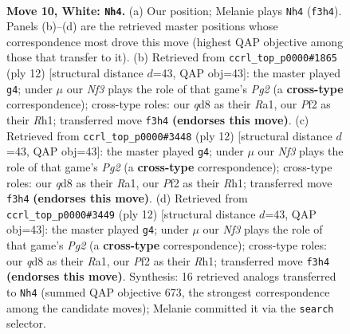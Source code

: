 \documentclass[11pt]{article}
\begin{document}
\clearpage

\begin{figure}[p]\centering
\begin{subfigure}{0.46\textwidth}\centering
\resizebox{\linewidth}{!}{%
\newchessgame
\chessboard[
  setfen={rnbqk2r/1p2bp2/4pnp1/p1Pp3p/3P4/2N2N1P/PP3PP1/R1BQKBR1 w Qkq - 0 10},
  showmover=false,
  pgfstyle=straightmove, color=movearrow, markmove={f3-h4}
]}
\caption{}
\end{subfigure}\hfill
\begin{subfigure}{0.46\textwidth}\centering
\resizebox{\linewidth}{!}{%
\newchessgame
\chessboard[
  setfen={rnbqkb1r/1p3ppp/p2ppn2/8/3NP3/2N4P/PPP2PP1/R1BQKB1R w KQkq - 0 7},
  showmover=false,
  pgfstyle=straightmove, color=movearrow, markmove={g2-g4}
]}
\caption{}
\end{subfigure}
\\[4pt]
\begin{subfigure}{0.46\textwidth}\centering
\resizebox{\linewidth}{!}{%
\newchessgame
\chessboard[
  setfen={rnbqkb1r/1p3ppp/p2ppn2/8/3NP3/2N4P/PPP2PP1/R1BQKB1R w KQkq - 0 7},
  showmover=false,
  pgfstyle=straightmove, color=movearrow, markmove={g2-g4}
]}
\caption{}
\end{subfigure}\hfill
\begin{subfigure}{0.46\textwidth}\centering
\resizebox{\linewidth}{!}{%
\newchessgame
\chessboard[
  setfen={rnbqkb1r/1p3ppp/p2ppn2/8/3NP3/2N4P/PPP2PP1/R1BQKB1R w KQkq - 0 7},
  showmover=false,
  pgfstyle=straightmove, color=movearrow, markmove={g2-g4}
]}
\caption{}
\end{subfigure}
\caption{\textbf{Move 10, White: \texttt{Nh4}.} (a) Our position; Melanie plays \texttt{Nh4} (\texttt{f3h4}). Panels (b)--(d) are the retrieved master positions whose correspondence most drove this move (highest QAP objective among those that transfer to it). (b) Retrieved from \texttt{ccrl\_top\_p0000\#1865} (ply 12) [structural distance $d$=43, QAP obj=43]: the master played \texttt{g4}; under $\mu$ our \emph{Nf3} plays the role of that game's \emph{Pg2} (a \textbf{cross-type} correspondence); cross-type roles: our \emph{q}d8 as their \emph{R}a1, our \emph{P}f2 as their \emph{R}h1; transferred move \texttt{f3h4} \textbf{(endorses this move)}. (c) Retrieved from \texttt{ccrl\_top\_p0000\#3448} (ply 12) [structural distance $d$=43, QAP obj=43]: the master played \texttt{g4}; under $\mu$ our \emph{Nf3} plays the role of that game's \emph{Pg2} (a \textbf{cross-type} correspondence); cross-type roles: our \emph{q}d8 as their \emph{R}a1, our \emph{P}f2 as their \emph{R}h1; transferred move \texttt{f3h4} \textbf{(endorses this move)}. (d) Retrieved from \texttt{ccrl\_top\_p0000\#3449} (ply 12) [structural distance $d$=43, QAP obj=43]: the master played \texttt{g4}; under $\mu$ our \emph{Nf3} plays the role of that game's \emph{Pg2} (a \textbf{cross-type} correspondence); cross-type roles: our \emph{q}d8 as their \emph{R}a1, our \emph{P}f2 as their \emph{R}h1; transferred move \texttt{f3h4} \textbf{(endorses this move)}. Synthesis: 16 retrieved analogs transferred to \texttt{Nh4} (summed QAP objective 673, the strongest correspondence among the candidate moves); Melanie committed it via the \texttt{search} selector.}
\label{fig:thought-m18}
\end{figure}
\end{document}
